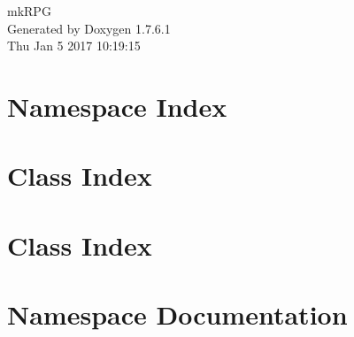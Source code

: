\documentclass[a4paper]{book}
\begin{document}
\hypersetup{pageanchor=false,citecolor=blue}
\begin{titlepage}
\vspace*{7cm}
\begin{center}
{\Large mk\-R\-P\-G }\\
\vspace*{1cm}
{\large \-Generated by Doxygen 1.7.6.1}\\
\vspace*{0.5cm}
{\small Thu Jan 5 2017 10:19:15}\\
\end{center}
\end{titlepage}
\clearemptydoublepage
{}
\tableofcontents
\clearemptydoublepage
{}
\hypersetup{pageanchor=true,citecolor=blue}
\chapter{\-Namespace \-Index}

\chapter{\-Class \-Index}

\chapter{\-Class \-Index}

\chapter{\-Namespace \-Documentation}
































\end{document}
